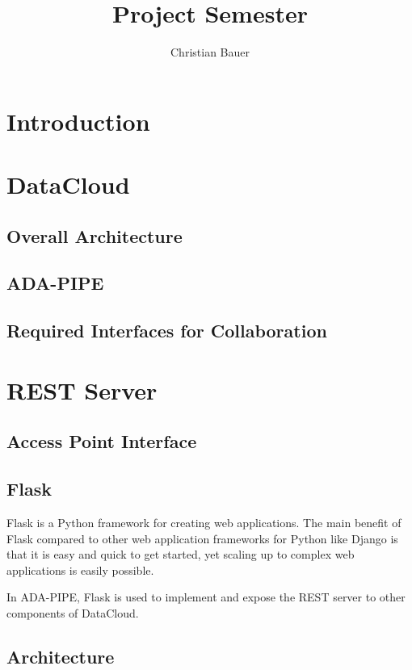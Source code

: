 \documentclass{article}
\title{Project Semester}
\author{Christian Bauer}
\begin{document}
    \maketitle

    \tableofcontents
    \lstlistoflistings
    \pagebreak

    \section{Introduction}

    \section{DataCloud}

        \subsection{Overall Architecture}
        \subsection{ADA-PIPE}
        \subsection{Required Interfaces for Collaboration}

    \section{REST Server}

        \subsection{Access Point Interface}
        \subsection{Flask}
        \label{sec:flask}

            Flask is a Python framework for creating web applications.
            The main benefit of Flask compared to other web application frameworks for Python like Django is that it is easy and quick to get started, yet scaling up to complex web applications is easily possible.

            In ADA-PIPE, Flask is used to implement and expose the REST server to other components of DataCloud.
        \subsection{Architecture}
\end{document}
